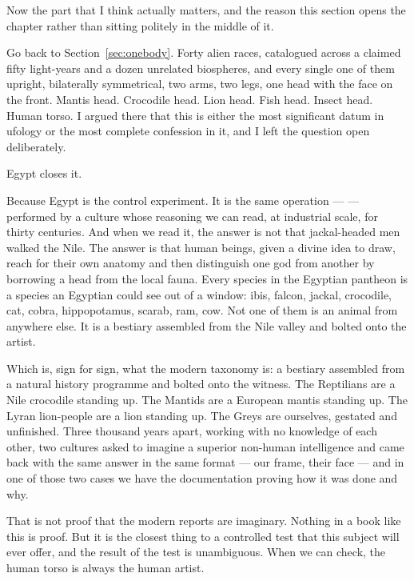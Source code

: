 Now the part that I think actually matters, and the reason this section opens the chapter rather
than sitting politely in the middle of it.

Go back to Section~\ref{sec:onebody}. Forty alien races, catalogued across a claimed fifty
light-years and a dozen unrelated biospheres, and every single one of them upright, bilaterally
symmetrical, two arms, two legs, one head with the face on the front. Mantis head. Crocodile
head. Lion head. Fish head. Insect head. Human torso. I argued there that this is either the
most significant datum in ufology or the most complete confession in it, and I left the question
open deliberately.

Egypt closes it.

Because Egypt is the control experiment. It is the same operation ---  --- performed by a culture whose reasoning we can read, at industrial scale, for
thirty centuries. And when we read it, the answer is not that jackal-headed men walked the Nile.
The answer is that human beings, given a divine idea to draw, reach for their own anatomy and
then distinguish one god from another by borrowing a head from the local fauna. Every species in
the Egyptian pantheon is a species an Egyptian could see out of a window: ibis, falcon, jackal,
crocodile, cat, cobra, hippopotamus, scarab, ram, cow. Not one of them is an animal from anywhere
else. It is a bestiary assembled from the Nile valley and bolted onto the artist.

Which is, sign for sign, what the modern taxonomy is: a bestiary assembled from a natural history
programme and bolted onto the witness. The Reptilians are a Nile crocodile standing up. The
Mantids are a European mantis standing up. The Lyran lion-people are a lion standing up. The
Greys are ourselves, gestated and unfinished. Three thousand years apart, working with no
knowledge of each other, two cultures asked to imagine a superior non-human intelligence and
came back with the same answer in the same format --- our frame, their face --- and in one of
those two cases we have the documentation proving how it was done and why.

That is not proof that the modern reports are imaginary. Nothing in a book like this is proof.
But it is the closest thing to a controlled test that this subject will ever offer, and the
result of the test is unambiguous. When we can check, the human torso is always the human
artist.

